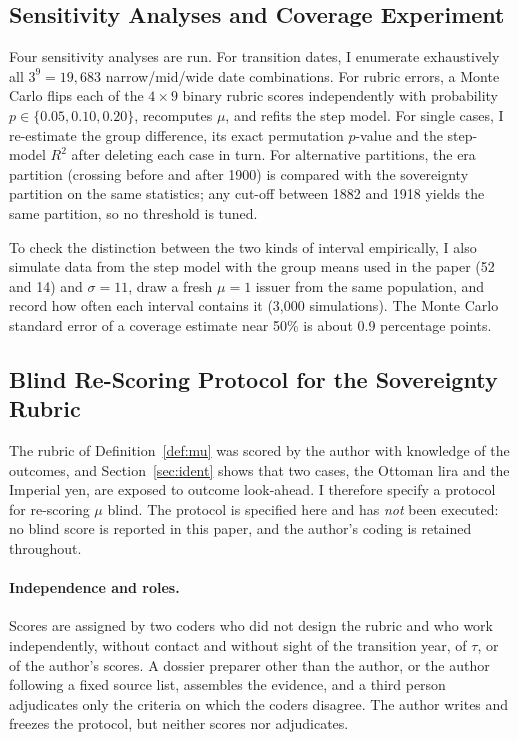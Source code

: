\documentclass[11pt,letterpaper]{article}
\theoremstyle{definition}
\theoremstyle{plain}
\begin{document}
\subsection{Sensitivity Analyses and Coverage Experiment}\label{sec:sens}
Four sensitivity analyses are run. For transition dates, I enumerate exhaustively all $3^9=19{,}683$ narrow/mid/wide date combinations. For rubric errors, a Monte Carlo flips each of the $4\times9$ binary rubric scores independently with probability $p\in\{0.05,0.10,0.20\}$, recomputes $\mu$, and refits the step model. For single cases, I re-estimate the group difference, its exact permutation $p$-value and the step-model $R^2$ after deleting each case in turn. For alternative partitions, the era partition (crossing before and after 1900) is compared with the sovereignty partition on the same statistics; any cut-off between 1882 and 1918 yields the same partition, so no threshold is tuned.

To check the distinction between the two kinds of interval empirically, I also simulate data from the step model with the group means used in the paper (52 and 14) and $\sigma=11$, draw a fresh $\mu=1$ issuer from the same population, and record how often each interval contains it (3,000 simulations). The Monte Carlo standard error of a coverage estimate near 50\% is about 0.9 percentage points.

\subsection{Blind Re-Scoring Protocol for the Sovereignty Rubric}\label{sec:blind}
The rubric of Definition~\ref{def:mu} was scored by the author with knowledge of the outcomes, and Section~\ref{sec:ident} shows that two cases, the Ottoman lira and the Imperial yen, are exposed to outcome look-ahead. I therefore specify a protocol for re-scoring $\mu$ blind. The protocol is specified here and has \emph{not} been executed: no blind score is reported in this paper, and the author's coding is retained throughout.

\paragraph{Independence and roles.} Scores are assigned by two coders who did not design the rubric and who work independently, without contact and without sight of the transition year, of $\tau$, or of the author's scores. A dossier preparer other than the author, or the author following a fixed source list, assembles the evidence, and a third person adjudicates only the criteria on which the coders disagree. The author writes and freezes the protocol, but neither scores nor adjudicates.
\end{document}
